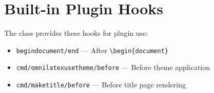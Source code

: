 \documentclass[
    language=english,
    doctype=article,
    institution=none,
]{../../omnilatex}
\begin{document}
\section{Built-in Plugin Hooks}

The class provides these hooks for plugin use:

\begin{itemize}
  \item \texttt{begindocument/end} — After \texttt{\textbackslash begin\{document\}}
  \item \texttt{cmd/omnilatexusetheme/before} — Before theme application
  \item \texttt{cmd/maketitle/before} — Before title page rendering
\end{itemize}
\end{document}
